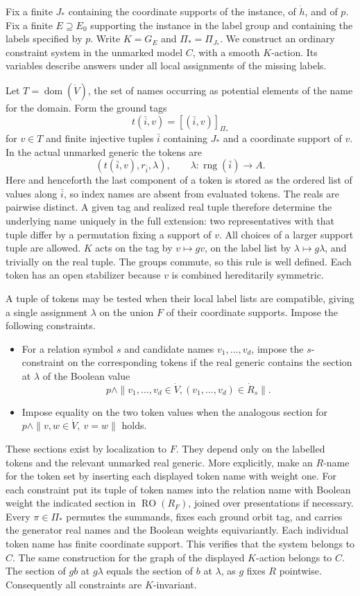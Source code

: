 \documentclass[11pt]{article}
\newcommand{\RO}{\operatorname{RO}}
\newcommand{\dom}{\operatorname{dom}}
\begin{document}
Fix a finite $J_*$ containing the coordinate supports of the instance, of $\dot h$, and of $p$. Fix a finite $E\supseteq E_0$ supporting the instance in the label group and containing the labels specified by $p$. Write $K=G_E$ and $\Pi_*=\Pi_{J_*}$. We construct an ordinary constraint system in the unmarked model $C$, with a smooth $K$-action. Its variables describe answers under all local assignments of the missing labels.

Let $T=\dom(\dot V)$, the set of names occurring as potential elements of the name for the domain. Form the ground tags
\[
         t(\bar i,v)=[(\bar i,v)]_{\Pi_*}
\]
for $v\in T$ and finite injective tuples $\bar i$ containing $J_*$ and a coordinate support of $v$. In the actual unmarked generic the tokens are
\[
     (t(\bar i,v),r_{\bar i},\lambda),
     \qquad \lambda:\operatorname{rng}(\bar i)\to A.
\]
Here and henceforth the last component of a token is stored as the ordered list of values along $\bar i$, so index names are absent from evaluated tokens. The reals are pairwise distinct. A given tag and realized real tuple therefore determine the underlying name uniquely in the full extension: two representatives with that tuple differ by a permutation fixing a support of $v$. All choices of a larger support tuple are allowed. $K$ acts on the tag by $v\mapsto gv$, on the label list by $\lambda\mapsto g\lambda$, and trivially on the real tuple. The groups commute, so this rule is well defined. Each token has an open stabilizer because $v$ is combined hereditarily symmetric.

A tuple of tokens may be tested when their local label lists are compatible, giving a single assignment $\lambda$ on the union $F$ of their coordinate supports. Impose the following constraints.
\begin{itemize}
\item For a relation symbol $s$ and candidate names $v_1,\ldots,v_d$, impose the $s$-constraint on the corresponding tokens if the real generic contains the section at $\lambda$ of the Boolean value
\[
        p\wedge\|v_1,\ldots,v_d\in\dot V,                    (v_1,\ldots,v_d)\in\dot R_s\|.
\]
\item Impose equality on the two token values when the analogous section for $p\wedge\|v,w\in\dot V,\ v=w\|$ holds.
\end{itemize}
These sections exist by localization to $F$. They depend only on the labelled tokens and the relevant unmarked real generic. More explicitly, make an $R$-name for the token set by inserting each displayed token name with weight one. For each constraint put its tuple of token names into the relation name with Boolean weight the indicated section in $\RO(R_F)$, joined over presentations if necessary. Every $\pi\in\Pi_*$ permutes the summands, fixes each ground orbit tag, and carries the generator real names and the Boolean weights equivariantly. Each individual token name has finite coordinate support. This verifies that the system belongs to $C$. The same construction for the graph of the displayed $K$-action belongs to $C$. The section of $g b$ at $g\lambda$ equals the section of $b$ at $\lambda$, as $g$ fixes $R$ pointwise. Consequently all constraints are $K$-invariant.
\end{document}
